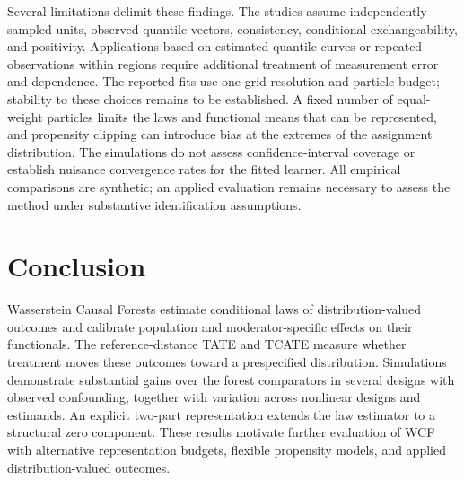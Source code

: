 Several limitations delimit these findings. The studies assume independently sampled units, observed quantile vectors, consistency, conditional exchangeability, and positivity. Applications based on estimated quantile curves or repeated observations within regions require additional treatment of measurement error and dependence. The reported fits use one grid resolution and particle budget; stability to these choices remains to be established. A fixed number of equal-weight particles limits the laws and functional means that can be represented, and propensity clipping can introduce bias at the extremes of the assignment distribution. The simulations do not assess confidence-interval coverage or establish nuisance convergence rates for the fitted learner. All empirical comparisons are synthetic; an applied evaluation remains necessary to assess the method under substantive identification assumptions.

\section{Conclusion}\label{sec:conclusion}

Wasserstein Causal Forests estimate conditional laws of distribution-valued outcomes and calibrate population and moderator-specific effects on their functionals. The reference-distance TATE and TCATE measure whether treatment moves these outcomes toward a prespecified distribution. Simulations demonstrate substantial gains over the forest comparators in several designs with observed confounding, together with variation across nonlinear designs and estimands. An explicit two-part representation extends the law estimator to a structural zero component. These results motivate further evaluation of WCF with alternative representation budgets, flexible propensity models, and applied distribution-valued outcomes.
